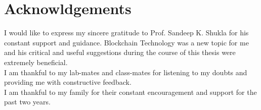 \chapter*{Acknowldgements}


I would like to express my sincere gratitude to Prof. Sandeep K. Shukla for his constant support
and guidance. Blockchain Technology was a new topic for me and his critical and useful suggestions
during the course of this thesis were extremely beneficial.\\
I am thankful to my lab-mates and class-mates for listening to my doubts and providing me with
constructive feedback.\\
I am thankful to my family for their constant encouragement and support for the past two years.

\vspace*{0.4in}

\noindent \hfill \textbf{\authorname}